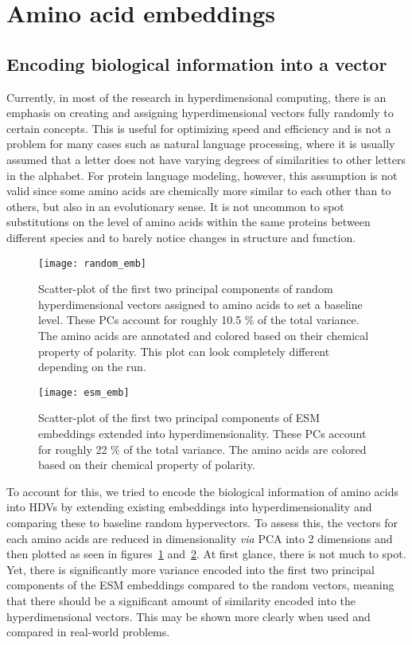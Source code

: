\section{Amino acid embeddings}
\subsection*{Encoding biological information into a vector}
Currently, in most of the research in hyperdimensional computing, there is an emphasis on creating and assigning hyperdimensional vectors fully randomly to certain concepts. This is useful for optimizing speed and efficiency and is not a problem for many cases such as natural language processing, where it is usually assumed that a letter does not have varying degrees of similarities to other letters in the alphabet. For protein language modeling, however, this assumption is not valid since some amino acids are chemically more similar to each other than to others, but also in an evolutionary sense. It is not uncommon to spot substitutions on the level of amino acids within the same proteins between different species and to barely notice changes in structure and function.

\begin{figure}[H]
    \centering
    \texttt{[image: random\_emb]}
    \caption{Scatter-plot of the first two principal components of random hyperdimensional vectors assigned to amino acids to set a baseline level. These PCs account for roughly 10.5 \% of the total variance. The amino acids are annotated and colored based on their chemical property of polarity. This plot can look completely different depending on the run.}\label{fig:AArand}
\end{figure}

\begin{figure}[H]
    \centering
    \texttt{[image: esm\_emb]}
    \caption{Scatter-plot of the first two principal components of ESM embeddings extended into hyperdimensionality. These PCs account for roughly 22 \% of the total variance. The amino acids are colored based on their chemical property of polarity.}\label{fig:AAesm}
\end{figure}

To account for this, we tried to encode the biological information of amino acids into HDVs by extending existing embeddings into hyperdimensionality and comparing these to baseline random hypervectors. To assess this, the vectors for each amino acids are reduced in dimensionality \textit{via} PCA into 2 dimensions and then plotted as seen in figures~\ref{fig:AArand} and~\ref{fig:AAesm}. At first glance, there is not much to spot. Yet, there is significantly more variance encoded into the first two principal components of the ESM embeddings compared to the random vectors, meaning that there should be a significant amount of similarity encoded into the hyperdimensional vectors. This may be shown more clearly when used and compared in real-world problems.

